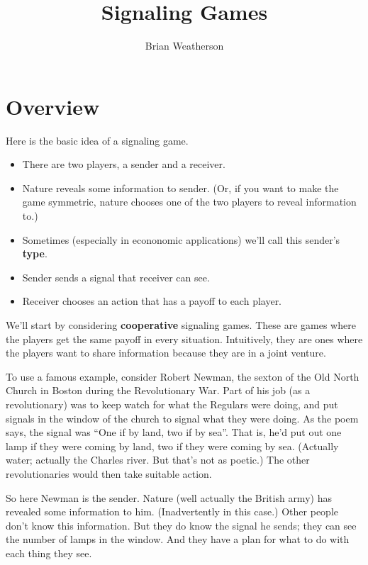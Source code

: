 \documentclass[
  11pt,
]{article}
\title{Signaling Games}
\author{Brian Weatherson}
\date{}
\providecommand{\tightlist}{%
  \setlength{\itemsep}{0pt}\setlength{\parskip}{0pt}}
\begin{document}
\maketitle

\hypertarget{overview}{%
\section{Overview}\label{overview}}

Here is the basic idea of a signaling game.

\begin{itemize}
\tightlist
\item
  There are two players, a sender and a receiver.
\item
  Nature reveals some information to sender. (Or, if you want to make
  the game symmetric, nature chooses one of the two players to reveal
  information to.)
\item
  Sometimes (especially in econonomic applications) we'll call this
  sender's \textbf{type}.
\item
  Sender sends a signal that receiver can see.
\item
  Receiver chooses an action that has a payoff to each player.
\end{itemize}

We'll start by considering \textbf{cooperative} signaling games. These
are games where the players get the same payoff in every situation.
Intuitively, they are ones where the players want to share information
because they are in a joint venture.

To use a famous example, consider Robert Newman, the sexton of the Old
North Church in Boston during the Revolutionary War. Part of his job (as
a revolutionary) was to keep watch for what the Regulars were doing, and
put signals in the window of the church to signal what they were doing.
As the poem says, the signal was ``One if by land, two if by sea''. That
is, he'd put out one lamp if they were coming by land, two if they were
coming by sea. (Actually water; actually the Charles river. But that's
not as poetic.) The other revolutionaries would then take suitable
action.

So here Newman is the sender. Nature (well actually the British army)
has revealed some information to him. (Inadvertently in this case.)
Other people don't know this information. But they do know the signal he
sends; they can see the number of lamps in the window. And they have a
plan for what to do with each thing they see.
\end{document}
